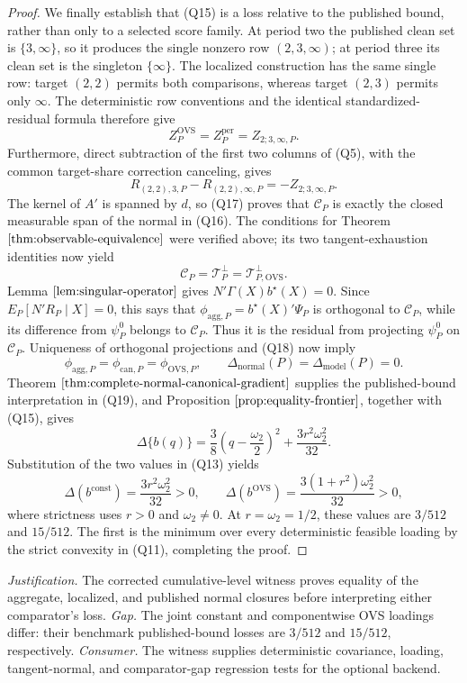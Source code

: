 \documentclass{article}
\begin{document}
\begin{proof}
We finally establish that (Q15) is a loss relative to the published bound, rather than only to a selected score family.  At period two the published clean set is \(\{3,\infty\}\), so it produces the single nonzero row \((2,3,\infty)\); at period three its clean set is the singleton \(\{\infty\}\).  The localized construction has the same single row: target \((2,2)\) permits both comparisons, whereas target \((2,3)\) permits only \(\infty\).  The deterministic row conventions and the identical standardized-residual formula therefore give
\[
 Z_P^{\mathrm{OVS}}=Z_P^{\mathrm{per}}=Z_{2;3,\infty,P}.
\tag{Q16}
\]
Furthermore, direct subtraction of the first two columns of (Q5), with the common target-share correction canceling, gives
\[
 R_{(2,2),3,P}-R_{(2,2),\infty,P}=-Z_{2;3,\infty,P}.
\tag{Q17}
\]
The kernel of \(A'\) is spanned by \(d\), so (Q17) proves that \(\mathcal C_P\) is exactly the closed measurable span of the normal in (Q16).  The conditions for Theorem \(\ref{thm:observable-equivalence}\) were verified above; its two tangent-exhaustion identities now yield
\[
 \mathcal C_P=\mathcal T_P^\perp=\mathcal T_{P,\mathrm{OVS}}^\perp.
\tag{Q18}
\]
Lemma \(\ref{lem:singular-operator}\) gives \(N'\Gamma(X)b^\star(X)=0\).  Since \(E_P[N'R_P\mid X]=0\), this says that \(\phi_{\mathrm{agg},P}=b^\star(X)'\Psi_P\) is orthogonal to \(\mathcal C_P\), while its difference from \(\psi_P^0\) belongs to \(\mathcal C_P\).  Thus it is the residual from projecting \(\psi_P^0\) on \(\mathcal C_P\).  Uniqueness of orthogonal projections and (Q18) now imply
\[
 \phi_{\mathrm{agg},P}=\phi_{\mathrm{can},P}=\phi_{\mathrm{OVS},P},
 \qquad
 \Delta_{\mathrm{normal}}(P)=\Delta_{\mathrm{model}}(P)=0.
\tag{Q19}
\]
Theorem \(\ref{thm:complete-normal-canonical-gradient}\) supplies the published-bound interpretation in (Q19), and Proposition \(\ref{prop:equality-frontier}\), together with (Q15), gives
\[
 \Delta\{b(q)\}
 =\frac38\left(q-\frac{\omega_2}{2}\right)^2
 +\frac{3r^2\omega_2^2}{32}.
\tag{Q20}
\]
Substitution of the two values in (Q13) yields
\[
 \Delta(b^{\mathrm{const}})=\frac{3r^2\omega_2^2}{32}>0,
 \qquad
 \Delta(b^{\mathrm{OVS}})=\frac{3(1+r^2)\omega_2^2}{32}>0,
\tag{Q21}
\]
where strictness uses \(r>0\) and \(\omega_2\ne0\).  At \(r=\omega_2=1/2\), these values are \(3/512\) and \(15/512\).  The first is the minimum over every deterministic feasible loading by the strict convexity in (Q11), completing the proof.
\end{proof}
\par\smallskip\noindent \textit{Justification.} The corrected cumulative-level witness proves equality of the aggregate, localized, and published normal closures before interpreting either comparator's loss. \textit{Gap.} The joint constant and componentwise OVS loadings differ: their benchmark published-bound losses are \(3/512\) and \(15/512\), respectively. \textit{Consumer.} The witness supplies deterministic covariance, loading, tangent-normal, and comparator-gap regression tests for the optional backend.
\end{document}
